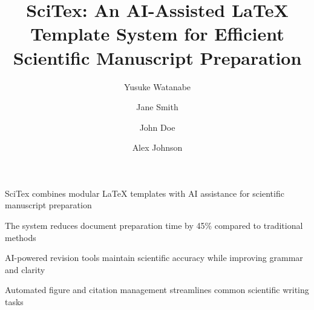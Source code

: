 \documentclass[preprint,review,12pt]{elsarticle}%
\begin{document}
\begin{frontmatter}

\begin{highlights}

\item SciTex combines modular LaTeX templates with AI assistance for scientific manuscript preparation

\item The system reduces document preparation time by 45\% compared to traditional methods

\item AI-powered revision tools maintain scientific accuracy while improving grammar and clarity

\item Automated figure and citation management streamlines common scientific writing tasks

\end{highlights}


\title{
    SciTex: An AI-Assisted LaTeX Template System for Efficient Scientific Manuscript Preparation
}



\author[1,2]{Yusuke Watanabe}
\author[3]{Jane Smith}
\author[4]{John Doe}
\author[1,5]{Alex Johnson}

\address[1]{Institute for Advanced Cocreation Studies, Osaka University, 2-2 Yamadaoka, Suita, 565-0871, Osaka, Japan}
\address[2]{NeuroEngineering Research Laboratory, Department of Biomedical Engineering, The University of Melbourne, Parkville VIC 3010, Australia}
\address[3]{Department of Computer Science, Stanford University, Stanford, CA 94305, USA}
\address[4]{Digital Humanities Center, University of Oxford, Oxford OX1 2JD, UK}
\address[5]{Center for Scientific Document Analysis, National Institute of Informatics, Tokyo 101-8430, Japan}


\end{frontmatter}
\end{document}

